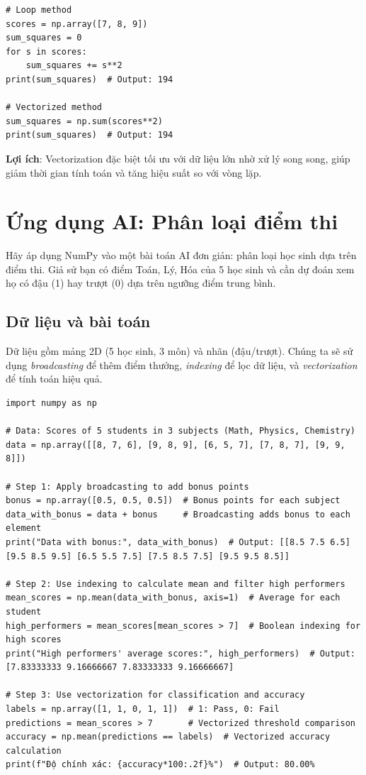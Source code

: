\begin{lstlisting}[caption={Vectorization so với vòng lặp}]
# Loop method
scores = np.array([7, 8, 9])
sum_squares = 0
for s in scores:
    sum_squares += s**2
print(sum_squares)  # Output: 194

# Vectorized method
sum_squares = np.sum(scores**2)
print(sum_squares)  # Output: 194
\end{lstlisting}

\textbf{Lợi ích}: Vectorization đặc biệt tối ưu với dữ liệu lớn nhờ xử lý song song, giúp giảm thời gian tính toán và tăng hiệu suất so với vòng lặp.

\section{Ứng dụng AI: Phân loại điểm thi}
Hãy áp dụng NumPy vào một bài toán AI đơn giản: phân loại học sinh dựa trên điểm thi. Giả sử bạn có điểm Toán, Lý, Hóa của 5 học sinh và cần dự đoán xem họ có đậu (1) hay trượt (0) dựa trên ngưỡng điểm trung bình.

\subsection{Dữ liệu và bài toán}
Dữ liệu gồm mảng 2D (5 học sinh, 3 môn) và nhãn (đậu/trượt). Chúng ta sẽ sử dụng \textit{broadcasting} để thêm điểm thưởng, \textit{indexing} để lọc dữ liệu, và \textit{vectorization} để tính toán hiệu quả.

\begin{lstlisting}[caption={Mã nguồn hoàn chỉnh phân loại điểm thi}]
import numpy as np

# Data: Scores of 5 students in 3 subjects (Math, Physics, Chemistry)
data = np.array([[8, 7, 6], [9, 8, 9], [6, 5, 7], [7, 8, 7], [9, 9, 8]])

# Step 1: Apply broadcasting to add bonus points
bonus = np.array([0.5, 0.5, 0.5])  # Bonus points for each subject
data_with_bonus = data + bonus     # Broadcasting adds bonus to each element
print("Data with bonus:", data_with_bonus)  # Output: [[8.5 7.5 6.5] [9.5 8.5 9.5] [6.5 5.5 7.5] [7.5 8.5 7.5] [9.5 9.5 8.5]]

# Step 2: Use indexing to calculate mean and filter high performers
mean_scores = np.mean(data_with_bonus, axis=1)  # Average for each student
high_performers = mean_scores[mean_scores > 7]  # Boolean indexing for high scores
print("High performers' average scores:", high_performers)  # Output: [7.83333333 9.16666667 7.83333333 9.16666667]

# Step 3: Use vectorization for classification and accuracy
labels = np.array([1, 1, 0, 1, 1])  # 1: Pass, 0: Fail
predictions = mean_scores > 7       # Vectorized threshold comparison
accuracy = np.mean(predictions == labels)  # Vectorized accuracy calculation
print(f"Độ chính xác: {accuracy*100:.2f}%")  # Output: 80.00%
\end{lstlisting}

